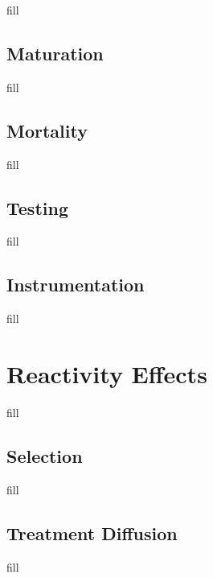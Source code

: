 \documentclass[
  b5paper]{book}
\begin{document}
fill

\hypertarget{maturation}{%
\subsection*{Maturation}\label{maturation}}

fill

\hypertarget{mortality}{%
\subsection*{Mortality}\label{mortality}}

fill

\hypertarget{testing}{%
\subsection*{Testing}\label{testing}}

fill

\hypertarget{instrumentation}{%
\subsection*{Instrumentation}\label{instrumentation}}

fill

\hypertarget{reactivity-effects}{%
\section{Reactivity Effects}\label{reactivity-effects}}

fill

\hypertarget{selection}{%
\subsection*{Selection}\label{selection}}

fill

\hypertarget{treatment-diffusion}{%
\subsection*{Treatment Diffusion}\label{treatment-diffusion}}

fill
\end{document}
